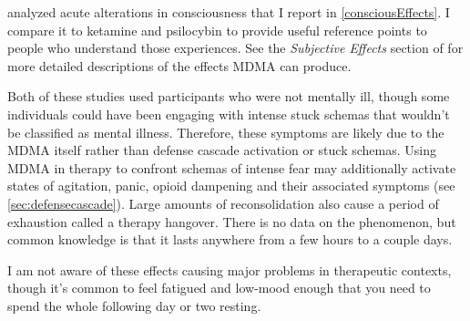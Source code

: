 \documentclass[11pt,oneside]{book}
\begin{document}
\textcite{studerus2010psychometric} analyzed acute alterations in consciousness that I report in \cref{consciousEffects}. I compare it to ketamine and psilocybin to provide useful reference points to people who understand those experiences. See the \textit{Subjective Effects} section of \textcite{effectindex} for more detailed descriptions of the effects MDMA can produce.

Both of these studies used participants who were not mentally ill, though some individuals could have been engaging with intense stuck schemas that wouldn't be classified as mental illness. Therefore, these symptoms are likely due to the MDMA itself rather than defense cascade activation or stuck schemas. Using MDMA in therapy to confront schemas of intense fear may additionally activate states of agitation, panic, opioid dampening and their associated symptoms (see \cref{sec:defensecascade}). Large amounts of reconsolidation also cause a period of exhaustion called a therapy hangover. There is no data on the phenomenon, but common knowledge is that it lasts anywhere from a few hours to a couple days.

I am not aware of these effects causing major problems in therapeutic contexts, though it's common to feel fatigued and low-mood enough that you need to spend the whole following day or two resting.
\end{document}
